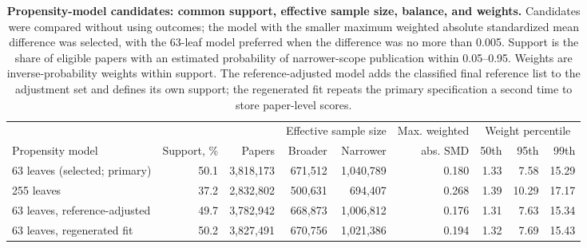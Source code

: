 \begin{table}[H]
\centering
\caption{\textbf{Propensity-model candidates: common support, effective sample size, balance, and weights.}
Candidates were compared without using outcomes; the model with the smaller maximum weighted absolute
standardized mean difference was selected, with the 63-leaf model preferred when the difference was no
more than 0.005. Support is the share of eligible papers with an estimated probability of narrower-scope
publication within 0.05--0.95. Weights are inverse-probability weights within support. The
reference-adjusted model adds the classified final reference list to the adjustment set and defines its
own support; the regenerated fit repeats the primary specification a second time to store
paper-level scores.}
\label{tab:propensity}
\footnotesize
\setlength{\tabcolsep}{4pt}
\begin{tabular}{@{}lrrrrrrrr@{}}
\toprule
 & & & \multicolumn{2}{c}{Effective sample size} & Max. weighted & \multicolumn{3}{c}{Weight percentile} \\
\cmidrule(lr){4-5}\cmidrule(l){7-9}
Propensity model & Support, \% & Papers & Broader & Narrower & abs. SMD & 50th & 95th & 99th \\
\midrule
63 leaves (selected; primary) & 50.1 & 3,818,173 & 671,512 & 1,040,789 & 0.180 & 1.33 & 7.58 & 15.29 \\
255 leaves & 37.2 & 2,832,802 & 500,631 & 694,407 & 0.268 & 1.39 & 10.29 & 17.17 \\
63 leaves, reference-adjusted & 49.7 & 3,782,942 & 668,873 & 1,006,812 & 0.176 & 1.31 & 7.63 & 15.34 \\
63 leaves, regenerated fit & 50.2 & 3,827,491 & 670,756 & 1,021,386 & 0.194 & 1.32 & 7.69 & 15.43 \\
\bottomrule
\end{tabular}
\end{table}
